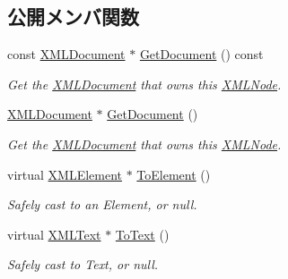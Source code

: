 \subsection*{公開メンバ関数}
\begin{DoxyCompactItemize}
\item 
\mbox{\label{classtinyxml2_1_1_x_m_l_node_a2de84cfa4ec3fe249bad745069d145f1}} 
const \hyperlink{classtinyxml2_1_1_x_m_l_document}{X\+M\+L\+Document} $\ast$ \hyperlink{classtinyxml2_1_1_x_m_l_node_a2de84cfa4ec3fe249bad745069d145f1}{Get\+Document} () const
\begin{DoxyCompactList}\small\item\em Get the \hyperlink{classtinyxml2_1_1_x_m_l_document}{X\+M\+L\+Document} that owns this \hyperlink{classtinyxml2_1_1_x_m_l_node}{X\+M\+L\+Node}. \end{DoxyCompactList}\item 
\mbox{\label{classtinyxml2_1_1_x_m_l_node_af343d1ef0b45c0020e62d784d7e67a68}} 
\hyperlink{classtinyxml2_1_1_x_m_l_document}{X\+M\+L\+Document} $\ast$ \hyperlink{classtinyxml2_1_1_x_m_l_node_af343d1ef0b45c0020e62d784d7e67a68}{Get\+Document} ()
\begin{DoxyCompactList}\small\item\em Get the \hyperlink{classtinyxml2_1_1_x_m_l_document}{X\+M\+L\+Document} that owns this \hyperlink{classtinyxml2_1_1_x_m_l_node}{X\+M\+L\+Node}. \end{DoxyCompactList}\item 
\mbox{\label{classtinyxml2_1_1_x_m_l_node_aab516e699567f75cc9ab2ef2eee501e8}} 
virtual \hyperlink{classtinyxml2_1_1_x_m_l_element}{X\+M\+L\+Element} $\ast$ \hyperlink{classtinyxml2_1_1_x_m_l_node_aab516e699567f75cc9ab2ef2eee501e8}{To\+Element} ()
\begin{DoxyCompactList}\small\item\em Safely cast to an Element, or null. \end{DoxyCompactList}\item 
\mbox{\label{classtinyxml2_1_1_x_m_l_node_a41c55dab9162d1eb62db2008430e376b}} 
virtual \hyperlink{classtinyxml2_1_1_x_m_l_text}{X\+M\+L\+Text} $\ast$ \hyperlink{classtinyxml2_1_1_x_m_l_node_a41c55dab9162d1eb62db2008430e376b}{To\+Text} ()
\begin{DoxyCompactList}\small\item\em Safely cast to Text, or null. \end{DoxyCompactList}\item 

\end{DoxyCompactItemize}
